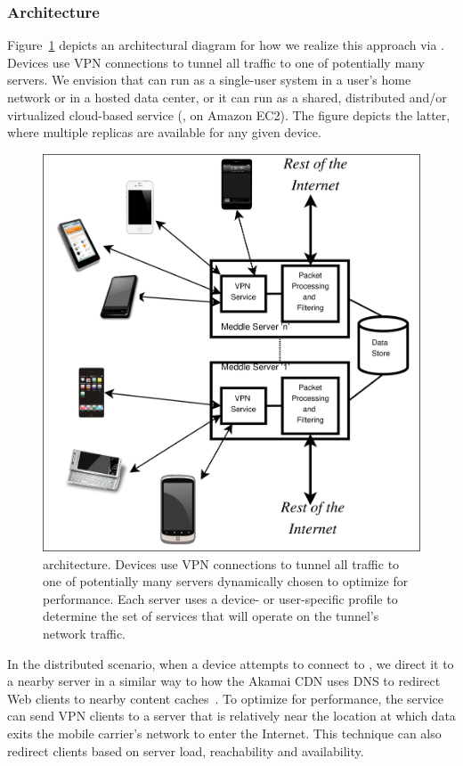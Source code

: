 \subsubsection{Architecture}
Figure~\ref{fig:arch} depicts an architectural diagram for how we realize this 
approach via \meddle. Devices use VPN connections to tunnel all 
traffic to one of potentially many \meddle servers. We envision that \meddle 
can run as a single-user system in a user's home network or in a hosted data center, 
or it can run as a shared, distributed and/or virtualized cloud-based service (\eg, on 
Amazon EC2). The 
figure depicts the latter, where multiple \meddle replicas are available for any 
given device. 

\begin{figure}
\centering
        \includegraphics[width=0.8\linewidth]{figs/meddle-servers.pdf}
\vspace{\figcapspace}
  \caption{\meddle architecture. Devices use VPN connections to tunnel all 
  traffic to one of potentially many \meddle servers dynamically chosen to 
  optimize for performance. Each \meddle server uses a device- or user-specific 
  profile to determine the set of services that will operate on the tunnel's network traffic.}
  \label{fig:arch}
\vspace{\postfigspace}
\end{figure}

In the distributed scenario, when a device attempts to connect to \meddle, we direct it to a nearby 
\meddle server in a similar way to how the Akamai CDN uses DNS to redirect 
Web clients to nearby content caches~\cite{akamai:cdn}. 
To optimize for performance, the service can send VPN clients to a 
server that is relatively near the location at which data exits
the mobile carrier's network to enter the Internet. This technique 
can also redirect clients based on server load, reachability and availability. 

